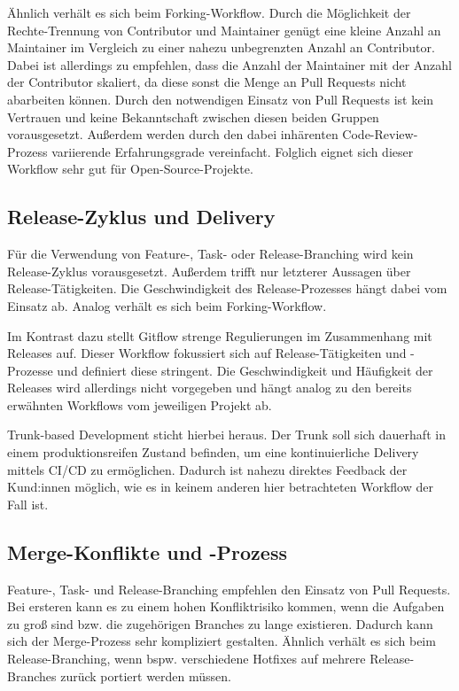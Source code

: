 Ähnlich verhält es sich beim Forking\hyp Workflow. Durch die Möglichkeit der Rechte\hyp Trennung von Contributor und Maintainer genügt eine kleine Anzahl an Maintainer im Vergleich zu einer nahezu unbegrenzten Anzahl an Contributor. Dabei ist allerdings zu empfehlen, dass die Anzahl der Maintainer mit der Anzahl der Contributor skaliert, da diese sonst die Menge an Pull Requests nicht abarbeiten können. Durch den notwendigen Einsatz von Pull Requests ist kein Vertrauen und keine Bekanntschaft zwischen diesen beiden Gruppen vorausgesetzt. Außerdem werden durch den dabei inhärenten Code\hyp Review\hyp Prozess variierende Erfahrungsgrade vereinfacht. Folglich eignet sich dieser Workflow sehr gut für Open\hyp Source\hyp Projekte.


\subsection{Release\hyp Zyklus und Delivery}

Für die Verwendung von Feature-, Task- oder Release\hyp Branching wird kein Release\hyp Zyklus vorausgesetzt. Außerdem trifft nur letzterer Aussagen über Release\hyp Tätigkeiten. Die Geschwindigkeit des Release\hyp Prozesses hängt dabei vom Einsatz ab. Analog verhält es sich beim Forking\hyp Workflow.

Im Kontrast dazu stellt Gitflow strenge Regulierungen im Zusammenhang mit Releases auf. Dieser Workflow fokussiert sich auf Release\hyp Tätigkeiten und -Prozesse und definiert diese stringent. Die Geschwindigkeit und Häufigkeit der Releases wird allerdings nicht vorgegeben und hängt analog zu den bereits erwähnten Workflows vom jeweiligen Projekt ab.

Trunk\hyp based Development sticht hierbei heraus. Der Trunk soll sich dauerhaft in einem produktionsreifen Zustand befinden, um eine kontinuierliche Delivery mittels CI/CD zu ermöglichen. Dadurch ist nahezu direktes Feedback der Kund:innen möglich, wie es in keinem anderen hier betrachteten Workflow der Fall ist.


\subsection{Merge\hyp Konflikte und -Prozess}

Feature-, Task- und Release\hyp Branching empfehlen den Einsatz von Pull Requests. Bei ersteren kann es zu einem hohen Konfliktrisiko kommen, wenn die Aufgaben zu groß sind bzw. die zugehörigen Branches zu lange existieren. Dadurch kann sich der Merge\hyp Prozess sehr kompliziert gestalten. Ähnlich verhält es sich beim Release\hyp Branching, wenn bspw. verschiedene Hotfixes auf mehrere Release\hyp Branches zurück portiert werden müssen.

